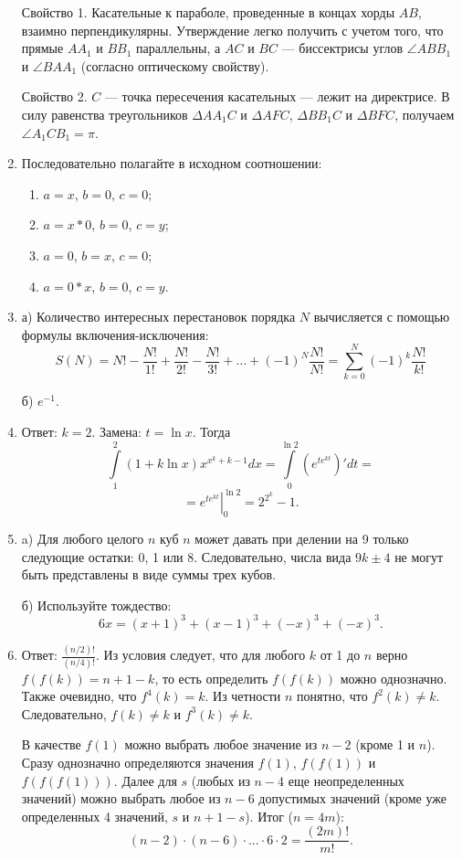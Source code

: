\documentclass[11pt, a4paper]{article}
\begin{document}
\begin{enumerate}
Свойство 1. Касательные к параболе, проведенные в концах хорды $AB$, взаимно перпендикулярны. Утверждение легко получить с учетом того, что прямые $AA_1$ и $BB_1$ параллельны, а $AC$ и $BC$ --- биссектрисы углов $\angle ABB_1$ и $\angle BAA_1$ (согласно оптическому свойству).

Свойство 2. $C$ --- точка пересечения касательных --- лежит на директрисе. В силу равенства треугольников $\Delta AA_1C$ и $\Delta AFC$, $\Delta BB_1C$ и $\Delta BFC$, получаем $\angle A_1CB_1 = \pi$.


\item Последовательно полагайте в исходном соотношении:
\begin{enumerate}
\item $a = x$, $b = 0$, $c = 0$;
\item $a = x * 0$, $b = 0$, $c = y$;
\item $a = 0$, $b = x$, $c = 0$;
\item $a = 0 * x$, $b = 0$, $c = y$.
\end{enumerate}

\item а) Количество интересных перестановок порядка $N$ вычисляется с помощью формулы включения-исключения:
$$S(N) = N!-{\frac {N!}{1!}}+{\frac {N!}{2!}}-{\frac {N!}{3!}} + \dots +(-1)^{N}{\frac {N!}{N!}}=\sum _{k=0}^{N}(-1)^{k}{\frac {N!}{k!}}
$$

б) $e^{-1}$.

\item Ответ: $k = 2$. Замена: $t = \ln{x}$. Тогда
$$\int\limits_{1}^{2} \left( 1 + k \ln{x} \right) x^{x^k + k - 1} dx = \int\limits_{0}^{\ln{2}} \left(e^{te^{kt}} \right)' dt = $$
$$=\left. e^{te^{kt}} \right|_{0}^{\ln{2}} = 2^{2^k} - 1.$$

\item a) Для любого целого $n$ куб $n$ может давать при делении на 9 только следующие остатки: 0, 1 или 8. Следовательно, числа вида $9k \pm 4$ не могут быть представлены в виде суммы трех кубов.

б) Используйте тождество:
$$6x = (x+1)^3 + (x-1)^3 + (-x)^3 + (-x)^3.$$

\item Ответ: $\frac{(n/2)!}{(n/4)!}$. Из условия следует, что для любого $k$ от 1 до $n$ верно $f(f(k)) = n + 1 - k$, то есть определить $f(f(k))$ можно однозначно. Также очевидно, что $f^4(k) = k$. Из четности $n$ понятно, что $f^2(k) \neq k$. Следовательно, $f(k) \neq k$ и $f^3(k) \neq k$. 

В качестве $f(1)$ можно выбрать любое значение из $n-2$ (кроме 1 и $n$). Сразу однозначно определяются значения $f(1)$, $f(f(1))$ и $f(f(f(1)))$. Далее для $s$ (любых из $n-4$ еще неопределенных значений) можно выбрать любое из $n-6$ допустимых значений (кроме уже определенных 4 значений, $s$ и $n+1-s$). Итог ($n = 4m$):
$$(n-2) \cdot  (n-6) \cdot  ... \cdot  6 \cdot 2 = \frac{(2m)!}{m!}.$$


\end{enumerate}
\end{document}
